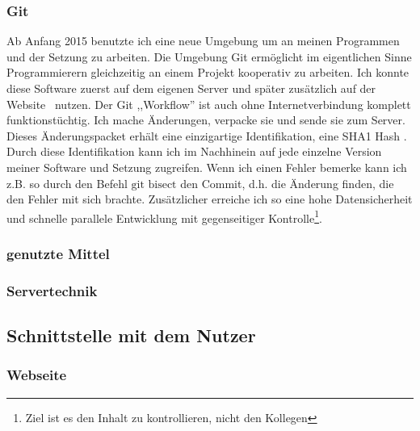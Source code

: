 \subsubsection*{Git}
Ab Anfang 2015 benutzte ich eine neue Umgebung um an meinen
Programmen und der Setzung zu arbeiten.
Die Umgebung Git \cite{gitrepo}
ermöglicht im eigentlichen Sinne Programmierern gleichzeitig an
einem Projekt kooperativ zu arbeiten.
Ich konnte diese Software zuerst auf dem eigenen Server und später zusätzlich
auf der Website  \cite{github} nutzen.
Der Git ,,Workflow'' ist auch ohne Internetverbindung komplett funktionstüchtig.
Ich mache Änderungen, verpacke sie und sende sie zum Server.
Dieses Änderungspacket erhält eine einzigartige Identifikation, eine SHA1 Hash \cite{gitsha1}.
Durch diese Identifikation kann ich im Nachhinein auf jede einzelne Version
meiner Software und Setzung zugreifen. Wenn ich einen Fehler bemerke kann ich z.B. so
durch den Befehl $\text{git bisect}$ den Commit, d.h. die Änderung finden, die den Fehler
mit sich brachte.
Zusätzlicher erreiche ich so eine hohe Datensicherheit \cite{linussaves} und schnelle parallele Entwicklung mit gegenseitiger Kontrolle\footnote{Ziel ist es den Inhalt zu kontrollieren, nicht den Kollegen}.

\subsubsection{genutzte Mittel} %

\subsubsection{Servertechnik} %

\subsection{Schnittstelle mit dem Nutzer} %

\subsubsection{Webseite} %

